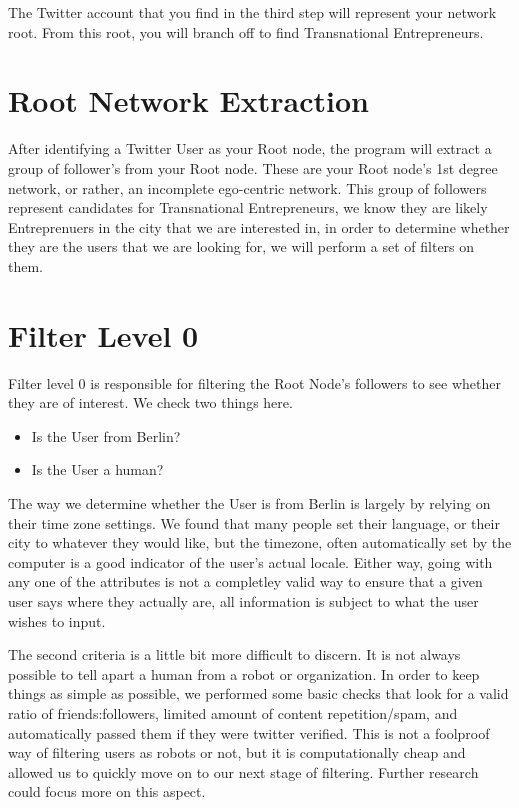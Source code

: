 The Twitter account that you find in the third step will represent
your network root. From this root, you will branch off to find
Transnational Entrepreneurs.

\section{Root Network Extraction}
After identifying a Twitter User as your Root node, the program will
extract a group of follower's from your Root node. These are your Root
node's 1st degree network, or rather, an incomplete ego-centric
network. This group of followers represent candidates for
Transnational Entrepreneurs, we know they are likely Entreprenuers in
the city that we are interested in, in order to determine whether they
are the users that we are looking for, we will perform a set of
filters on them.

\section{Filter Level 0}
Filter level 0 is responsible for filtering the Root Node's followers
to see whether they are of interest. We check two things here.

\begin{itemize}
\item Is the User from Berlin?
\item Is the User a human?
\end{itemize}

The way we determine whether the User is from Berlin is largely by
relying on their time zone settings. We found that many people set
their language, or their city to whatever they would like, but the
timezone, often automatically set by the computer is a good indicator
of the user's actual locale. Either way, going with any one of the
attributes is not a completley valid way to ensure that a given user
says where they actually are, all information is subject to what the
user wishes to input.

The second criteria is a little bit more difficult to discern. It is
not always possible to tell apart a human from a robot or
organization. In order to keep things as simple as possible, we
performed some basic checks that look for a valid ratio of
friends:followers, limited amount of content repetition/spam, and
automatically passed them if they were twitter verified. This is not a
foolproof way of filtering users as robots or not, but it is
computationally cheap and allowed us to quickly move on to our next
stage of filtering. Further research could focus more on this aspect.

